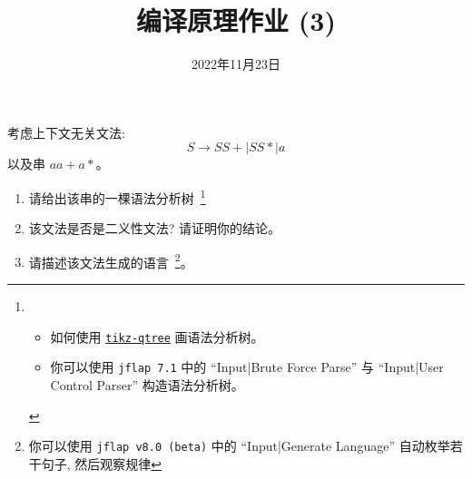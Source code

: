 \documentclass[a4paper, justified]{tufte-handout}
\title{编译原理作业 (3)}
\date{2022年11月23日}
\begin{document}
\maketitle
\noplagiarism %
\begin{abstract}
\end{abstract}
\beginrequired

\begin{problem}
  考虑上下文无关文法:
  \[
    S \to S S + \mid S S \ast \mid a
  \]
  以及串 $a a + a \ast$。

  \begin{enumerate}[(1)]
    \item 请给出该串的一棵语法分析树~\footnote{
      \begin{itemize}
        \item 如何使用 \href{https://mirrors.hit.edu.cn/CTAN/graphics/pgf/contrib/tikz-qtree/tikz-qtree-manual.pdf}{\texttt{tikz-qtree}} 画语法分析树。
        \item 你可以使用 \texttt{jflap 7.1} 中的 ``Input|Brute Force Parse'' 与 ``Input|User Control Parser'' 构造语法分析树。
      \end{itemize}}
    \item 该文法是否是二义性文法? 请证明你的结论。
    \item 请描述该文法生成的语言~\footnote{你可以使用 \texttt{jflap v8.0 (beta)} 中的 ``Input|Generate Language'' 自动枚举若干句子, 然后观察规律}。
  \end{enumerate}
\end{problem}

\begin{solution}
\end{solution}

\end{document}
